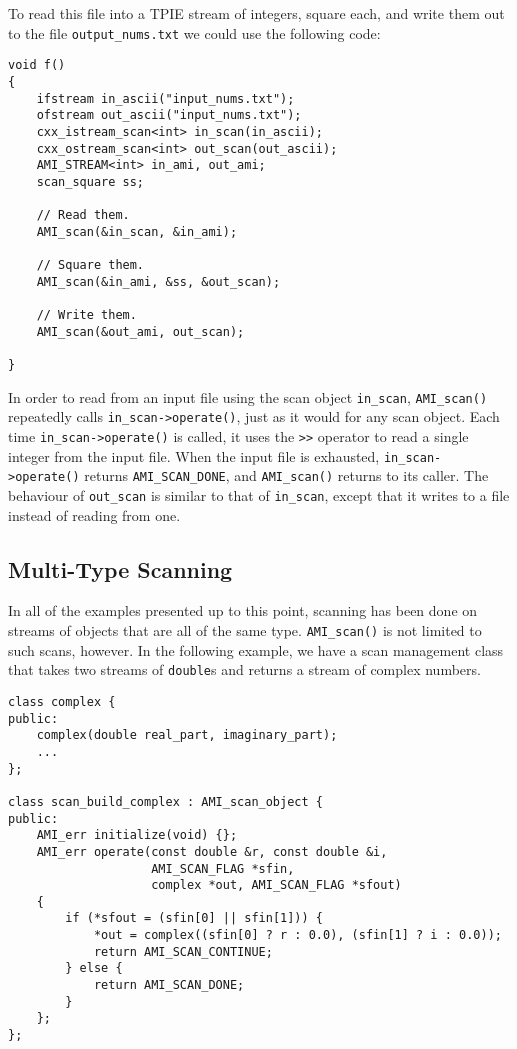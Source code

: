 To read this file into a TPIE stream of integers, square each, and
write them out to the file \verb|output_nums.txt| we could use the
following code:

\begin{verbatim}
void f()
{
    ifstream in_ascii("input_nums.txt");
    ofstream out_ascii("input_nums.txt");
    cxx_istream_scan<int> in_scan(in_ascii);
    cxx_ostream_scan<int> out_scan(out_ascii);
    AMI_STREAM<int> in_ami, out_ami;
    scan_square ss;    

    // Read them.
    AMI_scan(&in_scan, &in_ami);

    // Square them.
    AMI_scan(&in_ami, &ss, &out_scan);
    
    // Write them.
    AMI_scan(&out_ami, out_scan);

}    
\end{verbatim}

In order to read from an input file using the scan object
\verb|in_scan|, \verb|AMI_scan()| repeatedly calls
\verb|in_scan->operate()|, just as it would for any scan object.  Each
time \verb|in_scan->operate()| is called, it uses the \verb|>>|
operator to read a single integer from the input file.  When the input
file is exhausted, \verb|in_scan->operate()| returns
\verb|AMI_SCAN_DONE|, and \verb|AMI_scan()| returns to its caller.
The behaviour of \verb|out_scan| is similar to that of \verb|in_scan|,
except that it writes to a file instead of reading from one.

\subsection{Multi-Type Scanning}


In all of the examples presented up to this point, scanning has been
done on streams of objects that are all of the same type.
\verb|AMI_scan()| is not limited to such scans, however.  In the
following example, we have a scan management class that takes two
streams of \verb|double|s and returns a stream of complex numbers.

\begin{verbatim}
class complex {
public:
    complex(double real_part, imaginary_part);
    ...
};

class scan_build_complex : AMI_scan_object {
public:
    AMI_err initialize(void) {};
    AMI_err operate(const double &r, const double &i, 
                    AMI_SCAN_FLAG *sfin,
                    complex *out, AMI_SCAN_FLAG *sfout)
    {
        if (*sfout = (sfin[0] || sfin[1])) {
            *out = complex((sfin[0] ? r : 0.0), (sfin[1] ? i : 0.0));
            return AMI_SCAN_CONTINUE;
        } else {
            return AMI_SCAN_DONE;
        }   
    };
};
\end{verbatim}

